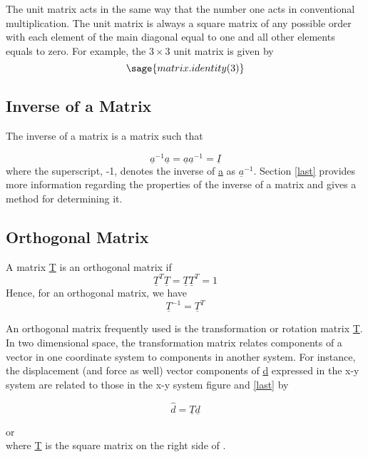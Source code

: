 \documentclass[12pt]{report}
\begin{document}
The unit matrix acts in the same way that the number one acts in
conventional multiplication. The unit matrix is always a square matrix
of any possible order with each element of the main diagonal equal to
one and all other elements equals to zero. For example, the $3 \times 3$
unit matrix is given by
\begin{equation}\sage{matrix.identity(3)}\end{equation}

\subsection{Inverse of a Matrix}

The inverse of a matrix is a matrix such that

\begin{equation}\underline{a}^{-1}\underline{a}=\underline{a}\underline{a}^{-1}=\underline{I}\end{equation}
where the superscript, -1, denotes the inverse of \underline{a} as $\underline{a}^{-1}$.
Section \ref{last} provides more information regarding the properties of the
inverse of a matrix and gives a method for determining it.

\subsection{Orthogonal Matrix}
A matrix \underline{T} is an orthogonal matrix if
\begin{equation}\underline{T}^T\underline{T} = \underline{T}\underline{T}^T=1\end{equation}
Hence, for an orthogonal matrix, we have
\begin{equation}\underline{T}^{-1}=\underline{T}^T\end{equation}

An orthogonal matrix frequently used is the transformation or rotation
matrix \underline{T}. In two dimensional space, the transformation matrix
relates components of a vector in one coordinate system to components
in another system. For instance, the displacement (and force as well)
vector components of \underline{d} expressed in the x-y system are related to
those in the x-y system figure and \ref{last} by

\begin{equation}\hat{d}=\underline{T}\underline{d}\end{equation}


or
\begin{equation} \label{eq:ortho}\end{equation}
where \underline{T} is the square matrix on the right side of \label{eq:ortho}.
\end{document}
